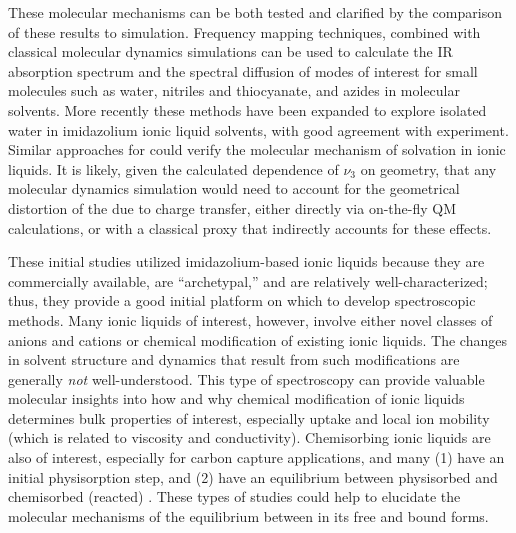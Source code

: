 {These molecular mechanisms can be both tested and clarified by the comparison of these results to simulation. Frequency mapping techniques, combined with classical molecular dynamics simulations can be used to calculate the IR absorption spectrum and the spectral diffusion of modes of interest for small molecules such as water,\cite{steinelCPL-04,Asbury2004,Corcelli2004} nitriles and thiocyanate,\cite{Choi2008,Lindquist2008} and azides\cite{liJPC-06,Li2006} in molecular solvents. More recently these methods have been expanded to explore isolated water in imidazolium ionic liquid solvents\cite{Terranova2014}, with good agreement with experiment.\cite{wongJPCB-13} Similar approaches for  could verify the molecular mechanism of  solvation in ionic liquids. It is likely, given the calculated dependence of \(\nu_3\) on  geometry, that any molecular dynamics simulation would need to account for the geometrical distortion of the  due to charge transfer, either directly via on-the-fly QM calculations, or with a classical proxy that indirectly accounts for these effects.

These initial studies utilized imidazolium-based ionic liquids because they are commercially available, are ``archetypal,'' and are relatively well-characterized; thus, they provide a good initial platform on which to develop spectroscopic methods. Many ionic liquids of interest, however, involve either novel classes of anions and cations or chemical modification of existing ionic liquids. The changes in solvent structure and dynamics that result from such modifications are generally \textit{not} well-understood. This type of spectroscopy can provide valuable molecular insights into how and why chemical modification of ionic liquids determines bulk properties of interest, especially  uptake and local ion mobility (which is related to viscosity and conductivity). Chemisorbing ionic liquids are also of interest, especially for carbon capture applications, and many (1) have an initial physisorption step, and (2) have an equilibrium between physisorbed and chemisorbed (reacted) . These types of studies could help to elucidate the molecular mechanisms of the equilibrium between  in its free and bound forms.

\section{\texorpdfstring{}{Conclusions}}
\label{sec:anions_conclusions}

}
